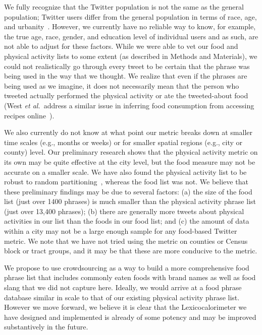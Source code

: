 \documentclass[10pt]{article}
\newcommand{\etal}{\textit{et al.}}
\begin{document}
We fully recognize
that the Twitter population is not the same as the general population;
Twitter users differ from the general population in terms of race,
age, and urbanity~\cite{pew}.  
However, we currently have no reliable
way to know, for example, the true age, race, gender, and education
level of individual users and as such, are not able to adjust for
these factors.  
While we were able to vet our food and physical
activity lists to some extent (as described in Methods and Materials), we could
not realistically go through every tweet to be certain that the phrase
was being used in the way that we thought.  
We realize that even if
the phrases are being used as we imagine, it does not necessarily mean
that the person who tweeted actually performed the physical activity
or ate the tweeted-about food (West \etal\ address a similar
issue in inferring food consumption from accessing recipes online~\cite{west2013}).

We also currently do not know at what point our metric breaks down at smaller
time scales (e.g., months or weeks) or for smaller spatial regions
(e.g., city or county) level.  Our preliminary research shows that the
physical activity metric on its own may be quite effective at the city
level, but the food measure may not be accurate on a smaller scale.
We have also found the physical activity list to be robust to random
partitioning~\cite{williams2014a}, whereas the food list was not.  
We believe that these preliminary findings may be due to several factors:
(a) the size of the food list (just over 1400 phrases) is much smaller
than the physical activity phrase list (just over 13,400 phrases); 
(b)
there are generally more tweets about physical activities in our
list than the foods in our food list; 
and (c) the amount of data
within a city may not be a large enough sample for any food-based
Twitter metric.
We note that we have not tried using the
metric on counties or Census block or tract groups, and it may be that
these are more conducive to the metric.

We propose to use crowdsourcing as a way to build a more comprehensive
food phrase list that includes commonly eaten foods with brand names
as well as food slang that we did not capture here.
Ideally, we would arrive at a food phrase database similar in
scale to that of our existing physical activity phrase list.
However we move forward, we believe it is clear that the 
 Lexicocalorimeter we have designed and implemented is already of some potency
and may be improved substantively in the future.
\end{document}

